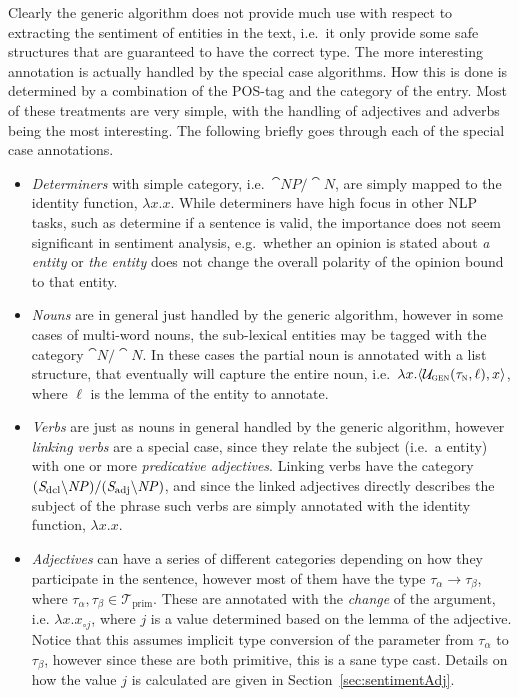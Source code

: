 Clearly the generic algorithm does not provide much use with respect to extracting the sentiment of entities in the text, i.e.\ it only provide some safe structures that are guaranteed to have the correct type. The more interesting annotation is actually handled by the special case algorithms. How this is done is determined by a combination of the POS-tag and the category of the entry. Most of these treatments are very simple, with the handling of adjectives and adverbs being the most interesting. The following briefly goes through each of the special case annotations.

\begin{itemize}
	\item \emph{Determiners} with simple category, i.e.\ $\cat{NP}/\cat{N}$, are simply mapped to the identity function, $\lambda x.x$.
	While determiners have high focus in other NLP tasks, such as determine if a sentence is valid, the importance does not seem significant in sentiment analysis, e.g.\ whether an opinion is stated about \emph{a entity} or \emph{the entity} does not change the overall polarity of the opinion bound to that entity.

	\item \emph{Nouns} are in general just handled by the generic algorithm, however in some cases of multi-word nouns, the sub-lexical entities may be tagged with the category $\cat{N}/\cat{N}$. In these cases the partial noun is annotated with a list structure, that eventually will capture the entire noun, i.e.\ $\lambda x.\langle \mathcal{U}_\textsc{gen}(\tau_\textsc{n}, \ell), x\rangle$, where $\ell$ is the lemma of the entity to annotate.

	\item \emph{Verbs} are just as nouns in general handled by the generic algorithm, however \emph{linking verbs} are a special case, since they relate the subject (i.e.\ a entity) with one or more \emph{predicative adjectives}. Linking verbs have the category $({\mathit{S}}_\mathrm{dcl} \backslash {\mathit{NP}})/({\mathit{S}}_\mathrm{adj} \backslash {\mathit{NP}})$, and since the linked adjectives directly describes the subject of the phrase such verbs are simply annotated with the identity function, $\lambda x.x$. 

	\item \emph{Adjectives} can have a series of different categories depending on how they participate in the sentence, however most of them have the type $\tau_\alpha \to \tau_\beta$, where $\tau_\alpha, \tau_\beta \in \mathcal{T}_\mathrm{prim}$. These are annotated with the \emph{change} of the argument, i.e. $\lambda x.x_{\circ j}$, where $j$ is a value determined based on the lemma of the adjective. Notice that this assumes implicit type conversion of the parameter from $\tau_\alpha$ to $\tau_\beta$, however since these are both primitive, this is a sane type cast. Details on how the value $j$ is calculated are given in Section~\ref{sec:sentimentAdj}.


\end{itemize}
